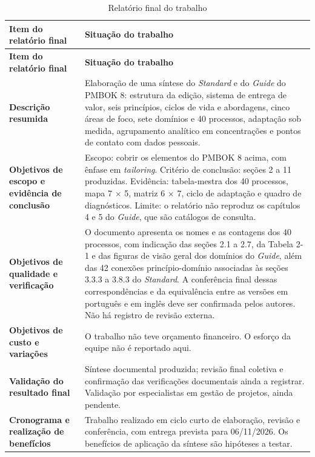\documentclass[11pt,a4paper]{article}
\newcommand{\SingleSpacing}{}
\begin{document}
\begingroup\SingleSpacing\small
\begin{longtable}{@{}>{\raggedright\arraybackslash}p{}>{\raggedright\arraybackslash}p{}@{}}
\caption{Relatório final do trabalho}\label{tab:t14}\\
\toprule
\textbf{Item do relatório final} & \textbf{Situação do trabalho}\\
\midrule
\endfirsthead
\toprule
\textbf{Item do relatório final} & \textbf{Situação do trabalho}\\
\midrule
\endhead
\bottomrule
\endfoot
\bottomrule
\endlastfoot
\textbf{Descrição resumida} & Elaboração de uma síntese do \textit{Standard} e do \textit{Guide} do PMBOK 8: estrutura da edição, sistema de entrega de valor, seis princípios, ciclos de vida e abordagens, cinco áreas de foco, sete domínios e 40 processos, adaptação sob medida, agrupamento analítico em concentrações e pontos de contato com dados pessoais.\\[3pt]
\textbf{Objetivos de escopo e evidência de conclusão} & Escopo: cobrir os elementos do PMBOK 8 acima, com ênfase em \textit{tailoring}. Critério de conclusão: seções 2 a 11 produzidas. Evidência: tabela-mestra dos 40 processos, mapa 7 \ensuremath{\times} 5, matriz 6 \ensuremath{\times} 7, ciclo de adaptação e quadro de diagnósticos. Limite: o relatório não reproduz os capítulos 4 e 5 do \textit{Guide}, que são catálogos de consulta.\\[3pt]
\textbf{Objetivos de qualidade e verificação} & O documento apresenta os nomes e as contagens dos 40 processos, com indicação das seções 2.1 a 2.7, da Tabela 2-1 e das figuras de visão geral dos domínios do \textit{Guide}, além das 42 conexões princípio-domínio associadas às seções 3.3.3 a 3.8.3 do \textit{Standard}. A conferência final dessas correspondências e da equivalência entre as versões em português e em inglês deve ser confirmada pelos autores. Não há registro de revisão externa.\\[3pt]
\textbf{Objetivos de custo e variações} & O trabalho não teve orçamento financeiro. O esforço da equipe não é reportado aqui.\\[3pt]
\textbf{Validação do resultado final} & Síntese documental produzida; revisão final coletiva e confirmação das verificações documentais ainda a registrar. Validação por especialistas em gestão de projetos, ainda pendente.\\[3pt]
\textbf{Cronograma e realização de benefícios} & Trabalho realizado em ciclo curto de elaboração, revisão e conferência, com entrega prevista para 06/11/2026. Os benefícios de aplicação da síntese são hipóteses a testar.\\[3pt]

\end{longtable}
\end{document}
